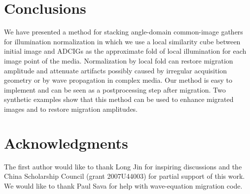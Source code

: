 


\section{Conclusions}

We have presented a method for stacking angle-domain common-image gathers for illumination normalization in which we use a local similarity cube between initial image and ADCIGs as the approximate fold of local illumination for each image point of the media. Normalization by local fold can restore migration amplitude and attenuate artifacts possibly caused by irregular acquisition geometry or by wave propagation in complex media. Our method is easy to implement and can be seen as a postprocessing step after migration. Two synthetic examples show that this method can be used to enhance migrated images and to restore migration amplitudes.

\section{Acknowledgments}

The first author would like to thank Long Jin for inspiring discussions and the China Scholarship Council (grant 2007U44003) for partial support of this work. We would like to thank Paul Sava for help with wave-equation migration code. 





